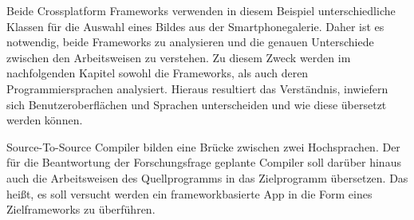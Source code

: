 \begin{minipage}{\linewidth}

\end{minipage}


\begin{minipage}{\linewidth}

\end{minipage}

Beide Crossplatform Frameworks verwenden in diesem Beispiel unterschiedliche Klassen für die Auswahl eines Bildes aus der Smartphonegalerie.  Daher ist es notwendig,  beide Frameworks zu analysieren und die genauen Unterschiede zwischen den Arbeitsweisen zu verstehen.  Zu diesem Zweck werden im nachfolgenden Kapitel sowohl die Frameworks, als auch deren Programmiersprachen analysiert.  Hieraus resultiert das Verständnis, inwiefern sich Benutzeroberflächen und Sprachen unterscheiden und wie diese übersetzt werden können.

Source-To-Source Compiler bilden eine Brücke zwischen zwei Hochsprachen.  Der für die Beantwortung der Forschungsfrage geplante Compiler soll darüber hinaus auch die Arbeitsweisen des Quellprogramms in das Zielprogramm übersetzen.  Das heißt, es soll versucht werden ein frameworkbasierte App in die Form eines Zielframeworks zu überführen. 




